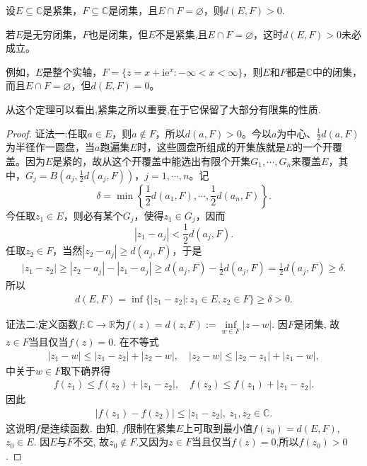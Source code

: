 \documentclass[../../main.tex]{subfiles}%
\begin{document}
\begin{theorem}\label{theorem:紧集和闭集无交则距离大于0}
设\(E\subseteq \mathbb{C}\)是紧集，\(F\subseteq \mathbb{C}\)是闭集，且\(E \cap F = \varnothing\)，则$d(E, F) > 0.$
\end{theorem}
\begin{remark}
若\(E\)是无穷闭集，\(F\)也是闭集，但$E$不是紧集,且\(E \cap F = \varnothing\)，这时\(d(E, F) > 0\)未必成立。

例如，\(E\)是整个实轴，\(F = \{ z = x + \mathrm{i}\mathrm{e}^x : -\infty < x < \infty \}\)，则\(E\)和\(F\)都是\(\mathbb{C}\)中的闭集，而且\(E \cap F = \varnothing\)，但\(d(E, F) = 0\)。
\end{remark}
\begin{note}
从这个定理可以看出,紧集之所以重要,在于它保留了大部分有限集的性质.
\end{note}
\begin{proof}

{\color{blue}证法一:}任取\(a \in E\)，则\(a \notin F\)，所以\(d(a, F) > 0\)。今以\(a\)为中心、\(\frac{1}{2}d(a, F)\)为半径作一圆盘，当\(a\)跑遍集\(E\)时，这些圆盘所组成的开集族就是\(E\)的一个开覆盖。因为\(E\)是紧的，故从这个开覆盖中能选出有限个开集\(G_1, \cdots, G_n\)来覆盖\(E\)，其中，\(G_j = B\left( a_j, \frac{1}{2}d(a_j, F) \right)\)，\(j = 1, \cdots, n\)。记
\[
\delta = \min\left\{ \frac{1}{2}d(a_1, F), \cdots, \frac{1}{2}d(a_n, F) \right\}.
\]
今任取\(z_1 \in E\)，则必有某个\(G_j\)，使得\(z_1 \in G_j\)，因而
\[
| z_1 - a_j | < \frac{1}{2}d(a_j, F).
\]
任取\(z_2 \in F\)，当然\(| z_2 - a_j | \geqslant d(a_j, F)\)，于是
\[
\begin{split}
| z_1 - z_2 | \geqslant | z_2 - a_j | - | z_1 - a_j | \geqslant d(a_j, F) - \frac{1}{2}d(a_j, F) = \frac{1}{2}d(a_j, F) \geqslant \delta.
\end{split}
\]
所以
\[
\begin{split}
d(E, F) = \inf\{ | z_1 - z_2 | : z_1 \in E, z_2 \in F \}  \geqslant \delta > 0.
\end{split}
\] 

{\color{blue}证法二:}定义函数$f:\mathbb{C}\to\mathbb{R}$为$f(z)=d(z,F):=\inf\limits_{w\in F}|z-w|$. 因$F$是闭集, 故$z\in F$当且仅当$f(z)=0$. 在不等式
\begin{align*}
|z_1-w|\leqslant |z_1-z_2|+|z_2-w|,\quad |z_2-w|\leqslant |z_2-z_1|+|z_1-w|,
\end{align*}
中关于$w\in F$取下确界得
\begin{align*}
f(z_1)\leqslant f(z_2)+|z_1-z_2|,\quad f(z_2)\leqslant f(z_1)+|z_1-z_2|.
\end{align*}
因此
\begin{align*}
|f(z_1)-f(z_2)|\leqslant|z_1-z_2|,\ z_1,z_2\in\mathbb{C}.
\end{align*}
这说明$f$是连续函数. 由知, $f$限制在紧集$E$上可取到最小值$f(z_0)=d(E,F)$, $z_0\in E$. 因$E$与$F$不交, 故$z_0\notin F$.又因为$z\in F$当且仅当$f(z)=0$,所以$f(z_0)>0$.

\end{proof}
\end{document}
